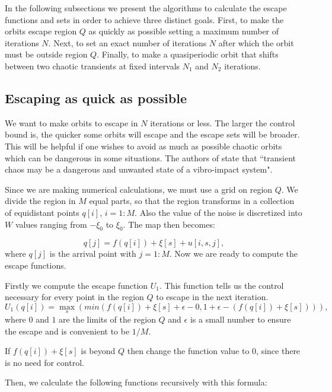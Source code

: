 In the following subsections we present the algorithms to calculate the escape functions and sets in order to achieve three distinct goals. First, to make the orbits escape region $Q$ as quickly as possible setting a maximum number of iterations $N$. Next, to set an exact number of iterations $N$ after which the orbit must be outside region $Q$. Finally, to make a quasiperiodic orbit that shifts between two chaotic transients at fixed intervals $N_1$ and $N_2$ iterations. 

\subsection{Escaping as quick as possible}

We want to make orbits to escape in $N$ iterations or less. The larger the control bound is, the quicker some orbits will escape and the escape sets will be broader. This will be helpful if one wishes to avoid as much as possible chaotic orbits which can be dangerous in some situations. The authors of \cite{AvoidTransient1} state that ``transient chaos may be a dangerous and unwanted state of a vibro-impact system". 

Since we are making numerical calculations, we must use a grid on region $Q$. We divide the region in $M$ equal parts, so that the region transforms in a collection of equidistant points $q[i]$, $i=1:M$. Also the value of the noise is discretized into $W$ values ranging from $-\xi_0$ to $\xi_0$. The map then becomes:

\begin{equation}
    q[j] = f(q[i]) +\xi[s] +u[i,s,j],
\end{equation}
where $q[j]$ is the arrival point with $j=1:M$. Now we are ready to compute the escape functions.

Firstly we compute the escape function $U_1$. This function tells us the control necessary for every point in the region $Q$ to escape in the next iteration. 
\begin{equation}
U_1(q[i]) = \max\limits_{s}(min(f(q[i]) + \xi[s] + \epsilon - 0, 1 + \epsilon - (f(q[i]) + \xi[s]))),
\end{equation}
where $0$ and $1$ are the limits of the region $Q$ and $\epsilon$ is a small number to ensure the escape and is convenient to be $1/M$.

If $f(q[i]) + \xi[s]$ is beyond $Q$ then change the function value to $0$, since there is no need for control.

Then, we calculate the following functions recursively with this formula:

